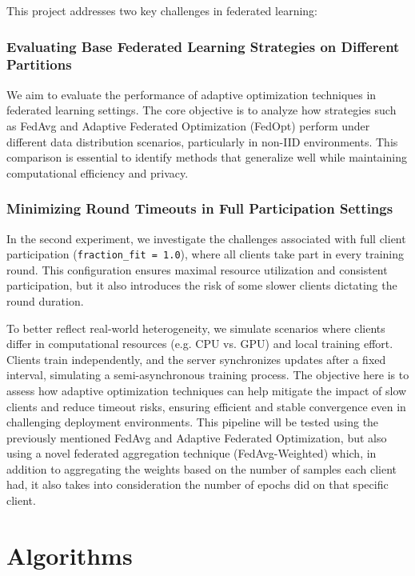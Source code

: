 \documentclass[11pt]{article}
\begin{document}
    This project addresses two key challenges in federated learning:

    \subsubsection{Evaluating Base Federated Learning Strategies on Different Partitions}
    We aim to evaluate the performance of adaptive optimization techniques in federated learning settings.
    The core objective is to analyze how strategies such as FedAvg and Adaptive Federated Optimization (FedOpt) perform under different data distribution scenarios, particularly in non-IID environments.
    This comparison is essential to identify methods that generalize well while maintaining computational efficiency and privacy.

    \subsubsection{Minimizing Round Timeouts in Full Participation Settings}
    In the second experiment, we investigate the challenges associated with full client participation (\texttt{fraction\_fit = 1.0}), where all clients take part in every training round. This configuration ensures maximal resource utilization and consistent participation, but it also introduces the risk of some slower clients dictating the round duration.

    To better reflect real-world heterogeneity, we simulate scenarios where clients differ in computational resources (e.g. CPU vs. GPU) and local training effort. Clients train independently, and the server synchronizes updates after a fixed interval, simulating a semi-asynchronous training process.
    The objective here is to assess how adaptive optimization techniques can help mitigate the impact of slow clients and reduce timeout risks, ensuring efficient and stable convergence even in challenging deployment environments.
    This pipeline will be tested using the previously mentioned FedAvg and Adaptive Federated Optimization, but also using a novel federated aggregation technique (FedAvg-Weighted) which, in addition to aggregating the weights based on the number of samples each client had, it also takes into consideration the number of epochs did on that specific client.


    \section{Algorithms}
\end{document}

